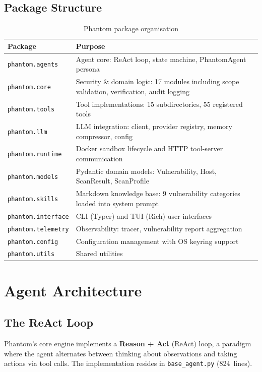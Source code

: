 \documentclass[11pt,a4paper]{article}
\begin{document}
\subsection{Package Structure}
\begin{table}[H]
\centering
\caption{Phantom package organisation}
\label{tab:packages}
\begin{tabularx}{\textwidth}{lX}
\toprule
\textbf{Package} & \textbf{Purpose} \\
\midrule
\texttt{phantom.agents}    & Agent core: ReAct loop, state machine, PhantomAgent persona \\
\texttt{phantom.core}      & Security \& domain logic: 17 modules including scope validation, verification, audit logging \\
\texttt{phantom.tools}     & Tool implementations: 15 subdirectories, 55 registered tools \\
\texttt{phantom.llm}       & LLM integration: client, provider registry, memory compressor, config \\
\texttt{phantom.runtime}   & Docker sandbox lifecycle and HTTP tool-server communication \\
\texttt{phantom.models}    & Pydantic domain models: Vulnerability, Host, ScanResult, ScanProfile \\
\texttt{phantom.skills}    & Markdown knowledge base: 9 vulnerability categories loaded into system prompt \\
\texttt{phantom.interface}  & CLI (Typer) and TUI (Rich) user interfaces \\
\texttt{phantom.telemetry}  & Observability: tracer, vulnerability report aggregation \\
\texttt{phantom.config}     & Configuration management with OS keyring support \\
\texttt{phantom.utils}      & Shared utilities \\
\bottomrule
\end{tabularx}
\end{table}


\section{Agent Architecture}
\label{sec:agent}

\subsection{The ReAct Loop}
Phantom's core engine implements a \textbf{Reason + Act} (ReAct) loop, a paradigm
where the agent alternates between thinking about observations and taking actions
via tool calls. The implementation resides in \texttt{base\_agent.py} (824~lines).
\end{document}
